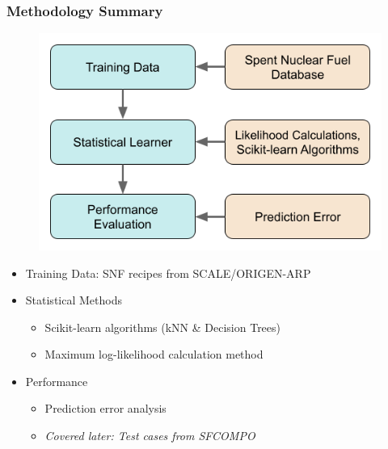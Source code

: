 \begin{frame}
  \frametitle{Methodology Summary}
  \begin{adjustwidth}{-10pt}{-10pt}
  \begin{minipage}{0.51\textwidth}
    \begin{figure}
      \centering
      \includegraphics[width=\textwidth]{./figures/meth_pres.png}
    \end{figure}
  \end{minipage}%
  \begin{minipage}{0.51\textwidth}
    \begin{itemize}
      \item Training Data: SNF recipes from SCALE/ORIGEN-ARP \cite{scale, origen}
      \item Statistical Methods
        \begin{itemize}
          \item Scikit-learn algorithms (kNN \& Decision Trees) \cite{scikit}
          \item Maximum log-likelihood calculation method \cite{mll_method, mll_sensitivity}
        \end{itemize}
      \item Performance
        \begin{itemize}
          \item Prediction error analysis
          \item \textit{Covered later: Test cases from SFCOMPO} \cite{sfcompo}
        \end{itemize}
    \end{itemize}
  \end{minipage}
  \end{adjustwidth}
\end{frame}

